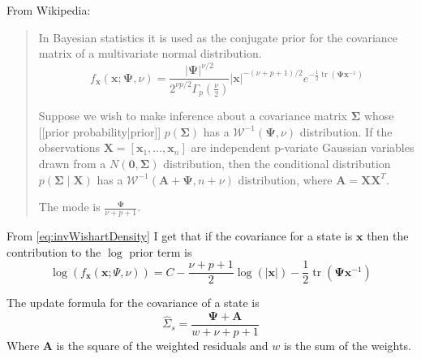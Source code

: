 \documentclass{article}
\begin{document}
From Wikipedia:
\begin{quote}

In Bayesian statistics it is used as the conjugate prior for the
covariance matrix of a multivariate normal distribution.
\begin{equation}
  \label{eq:invWishartDensity}
f_{\mathbf x}({\mathbf x}; {\mathbf \Psi}, \nu) = \frac{\left|{\mathbf\Psi}\right|^{\nu/2}}{2^{\nu p/2}\Gamma_p(\frac \nu 2)} \left|\mathbf{x}\right|^{-(\nu+p+1)/2} e^{-\frac{1}{2}\operatorname{tr}(\mathbf\Psi\mathbf{x}^{-1})}
\end{equation}

Suppose we wish to make inference about a covariance matrix
${\mathbf{\Sigma}}$ whose [[prior probability|prior]]
${p(\mathbf{\Sigma})}$ has a
$\mathcal{W}^{-1}({\mathbf\Psi},\nu)$ distribution.  If the
observations
$\mathbf{X}=[\mathbf{x}_1,\ldots,\mathbf{x}_n]$ are
independent p-variate Gaussian variables drawn from a
$N(\mathbf{0},{\mathbf \Sigma})$ distribution, then the
conditional distribution
${p(\mathbf{\Sigma}\mid\mathbf{X})}$ has a
$\mathcal{W}^{-1}({\mathbf A}+{\mathbf\Psi},n+\nu)$
distribution, where ${\mathbf{A}}=\mathbf{X}\mathbf{X}^T$.

The mode is $\frac{\mathbf{\Psi}}{\nu + p + 1}$.
\end{quote}

From \eqref{eq:invWishartDensity} I get that if the covariance for a
state is $\mathbf{x}$ then the contribution to the $\log$ prior term
is
\begin{equation}
  \label{eq:logfInvWishart}
  \log\left(f_{\mathbf{x}}\left(\mathbf{x};\Psi,\nu\right)\right) = C
  - \frac{\nu+p+1}{2}\log(|\mathbf{x}|) - \frac{1}{2}\operatorname{tr}(\mathbf\Psi\mathbf{x}^{-1})
\end{equation}

The update formula for the covariance of a state is
\begin{equation}
  \label{eq:updateMultivariate}
  \hat \Sigma_s = \frac {\mathbf{\Psi} + \mathbf{A}}{w + \nu + p + 1}
\end{equation}
Where $\mathbf{A}$ is the square of the weighted residuals and $w$ is the
sum of the weights.
\end{document}
